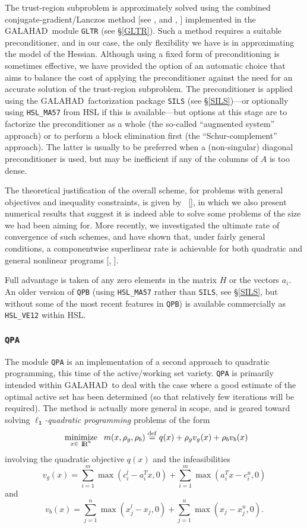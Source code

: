 \documentclass[acmtocl,acmnow]{acmtrans2m}
\newcommand{\minin}[1]{ {\renewcommand{\arraystretch}{0.8}
                     \begin{array}[t]{c}
                     \mbox{minimize} \vspace*{-1mm} \\
                     \mbox{ $\scriptstyle #1 $ }
                     \end{array} \;} }
\newcommand{\eqdef}{\stackrel{\rm def}{=}}
\newcommand{\gal}{{\sf GALAHAD}}
\newcommand{\ltsubsubsection}[1]{\subsubsection{{\tt #1}} \label{#1}}
\newcommand{\citebb}[1]{\citeauthor{#1}\ [\citeyear{#1}]}
\newcommand{\bciteb}[1]{\citeauthor{#1}, \citeyear{#1}}
\newcommand{\eqn}[2]{\begin{equation}\label{#1}{#2}\end{equation}}
\newcommand{\disp}[1]{\[{#1}\]}
\newcommand{\smallRe}
     {\mbox{\raisebox{-0.8pt}{\footnotesize I\hskip -1.5pt R\hskip -0.5pt}}}
\begin{document}
The trust-region subproblem is approximately solved using the
combined conjugate-gradient/Lan\-czos method [see \bciteb{GoulHribNoce98} and
\bciteb{GoulLuciRomaToin99:siopt}] implemented in the \gal\ module {\tt GLTR}
(see \S\ref{GLTR}).
Such a method requires a suitable preconditioner,
and in our case, the only flexibility we have is in approximating the
model of the Hessian. Although using a fixed form of preconditioning is
sometimes effective, we have provided the option of an automatic choice
that aims to balance the cost of applying the preconditioner against
the need for an accurate solution of the trust-region subproblem.
The preconditioner is applied using the \gal\ factorization package
{\tt SILS} (see \S\ref{SILS})---or optionally using {\tt HSL\_MA57}
from HSL if this is available---but options at this stage are
to factorize the preconditioner as a whole (the so-called ``augmented system''
approach) or to perform a block elimination first (the ``Schur-complement''
approach). The latter is usually to be preferred when a (non-singular) diagonal
preconditioner is used, but may be inefficient if any of the columns
of $A$ is too dense.

The theoretical justification of the
overall scheme, for problems with general objectives and
inequality constraints,
is given by \citebb{ConnGoulOrbaToin00:mp}, in which we also present
numerical results that suggest it is indeed able to solve
some problems of the size we had been aiming for.
More recently, we investigated the ultimate rate of convergence
of such schemes, and have shown that, under fairly general conditions,
a componentwise superlinear rate is achievable for both quadratic and general
nonlinear programs [\bciteb{GoulOrbaSartToin01}].

Full advantage is taken of any zero elements in the matrix $H$ or the
vectors $a_{i}$.
An older version of {\tt QPB} (using {\tt HSL\_MA57} rather than {\tt SILS},
see \S\ref{SILS}, but without some of the most recent features in {\tt QPB})
is available commercially as {\tt HSL\_VE12} within HSL.

\ltsubsubsection{QPA}

The module {\tt QPA} is an implementation of a second approach
to quadratic programming, this time of the active/working set variety.
{\tt QPA} is primarily intended within \gal\ to deal with the case
where a good
estimate of the optimal active set has been determined (so that
relatively few iterations will be required). The method is actually more
general in scope, and is geared toward solving
{\em $\mathbf{\ell_1}$-quadratic programming} problems of the form
\eqn{1.1}{\minin{x \in \smallRe^n} m(x, \rho_g, \rho_b ) \eqdef
q(x) + \rho_g v_g(x) + \rho_b v_b(x)}
involving the quadratic objective $q(x)$ and the infeasibilities
\disp{v_g(x) =
   \sum_{i=1}^{m} \max ( c_{i}^{l} - a_i^T x, 0 )
 + \sum_{i=1}^{m} \max ( a_i^T x - c_{i}^{u}, 0 )}
and
\disp{v_b(x) =
   \sum_{j=1}^{n} \max ( x_{j}^{l} - x_{j}  , 0 )
 + \sum_{j=1}^{n} \max ( x_{j}  - x_{j}^{u} , 0 ) .}
\end{document}
